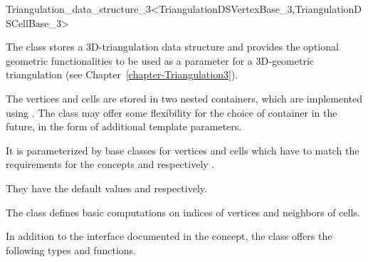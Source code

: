 

\begin{ccRefClass}{Triangulation_data_structure_3<TriangulationDSVertexBase_3,TriangulationDSCellBase_3>}

\ccDefinition
The class  stores a 3D-triangulation data
structure and provides the optional
geometric functionalities to be used as a parameter for a 
3D-geometric triangulation (see Chapter~\ref{chapter-Triangulation3}). 

The vertices and cells are stored in two nested containers, which are
implemented using .  The class may offer some
flexibility for the choice of container in the future, in the form of
additional template parameters.


\ccParameters
It is parameterized by base classes for vertices and cells which have to match
the requirements for the concepts  and
 respectively
.

They have the default values  and
 respectively.

\ccIsModel {}


The class  defines basic computations on
indices of vertices and neighbors of cells. 

\begin{ccAdvanced}


In addition to the interface documented in the concept, the class offers the
following types and functions.

\ccTypes


\end{ccAdvanced}
\end{ccRefClass}
